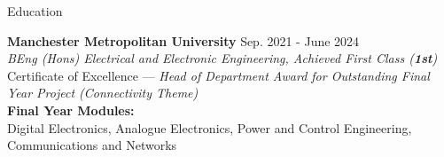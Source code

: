 \begin{rSection}{\normalsize Education}

{\bf Manchester Metropolitan University} \hfill {Sep. 2021 - June 2024}
\\ 
\textit {BEng (Hons) Electrical and Electronic Engineering, Achieved First Class (\textbf{1st})} 
\\
Certificate of Excellence — \textit{Head of Department Award for Outstanding Final Year Project (Connectivity Theme)}
\vspace{0.08cm}
\\
\textbf{Final Year Modules:} 
\\
Digital Electronics, Analogue Electronics, Power and Control Engineering, Communications and Networks
\end{rSection} 
\vspace{-0.2cm}